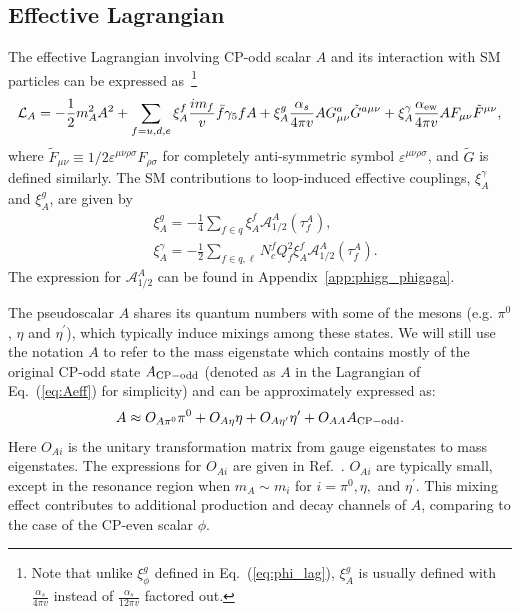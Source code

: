 \documentclass[letterpaper,11pt]{article}
\begin{document}
\subsection{Effective Lagrangian}
The effective Lagrangian involving CP-odd scalar $A$ and its interaction with SM particles can be expressed as~\footnote{Note that unlike $\xi_\phi^g$ defined in Eq.~(\ref{eq:phi_lag}), $\xi_A^g$ is usually defined with $\frac{\alpha_s}{4\pi v }$ instead of $\frac{\alpha_s}{12\pi v}$ factored out.}~\cite{Domingo:2016yih}  
\begin{equation}
    \mathcal{L}_{A}=-\frac{1}{2}m_A^2A^2+ \sum_{f=u, d, e} \xi_{A}^f \frac{im_f}{v}  \bar{f} \gamma_{5} f A+ \xi_A^g \frac{\alpha_s}{4\pi v} A G_{\mu\nu}^a\tilde G^{a \mu\nu}+ \xi_A^\gamma \frac{\alpha_{\rm ew}}{4\pi v} A F_{\mu\nu}\tilde F^{\mu\nu},
    \label{eq:Aeff}
\end{equation}
where $\tilde F_{\mu\nu}\equiv 1/2 \varepsilon^{\mu\nu\rho\sigma}F_{\rho\sigma}$ for completely anti-symmetric symbol $\varepsilon^{\mu\nu\rho\sigma}$, and $\tilde G$ is defined similarly.     
 The SM contributions to loop-induced effective couplings, $\xi_A^\gamma$ and $\xi_A^g$, are given by~\cite{Domingo:2016yih,Djouadi:2005gj}
 \begin{align}
    &\xi_A^g=-\frac{1}{4}\sum_{f \in q}\xi_{A}^f\mathcal{A}_{1/2}^A(\tau_f^A),
    \label{eq:xiAgluon}\\
    &\xi_A^\gamma=-\frac{1}{2} \sum_{f \in q,\ell}N_c^f Q_f^2\xi_{A}^f\mathcal{A}_{1/2}^A(\tau_f^A).
\label{eq:xiAgamma}
\end{align}
The expression for $\mathcal{A}_{1/2}^A$ can be found in Appendix~\ref{app:phigg_phigaga}.
  
The pseudoscalar $A$ shares its quantum
numbers with some of the mesons (e.g. $\pi^0$, $\eta$ and $\eta^\prime$), which typically induce mixings among these states. We will still use the notation $A$ to refer to the mass eigenstate which contains mostly of the original CP-odd state $A_{\rm CP-odd}$ (denoted as $A$ in the Lagrangian of Eq.~(\ref{eq:Aeff}) for simplicity)  and can be approximately expressed as:
\begin{equation}
    {A} \approx O_{A\pi^0}\pi^0+O_{A\eta}\eta+O_{A\eta'}\eta'+O_{AA}A_{\rm CP-odd}.
\label{eq:mesonmixing_1}
\end{equation} 
Here $O_{Ai}$ is the unitary transformation
matrix from gauge eigenstates to mass eigenstates. The expressions for $O_{Ai}$ are given in     Ref.~\cite{Domingo:2016yih}.   $O_{Ai}$ are typically small, except in the resonance region when $m_A\sim m_i$ for $i=\pi^0, \eta,$ and $\eta^\prime$.  This mixing effect contributes to additional production and decay channels of $A$, comparing to the case of the CP-even scalar $\phi$. 
 
\end{document}
